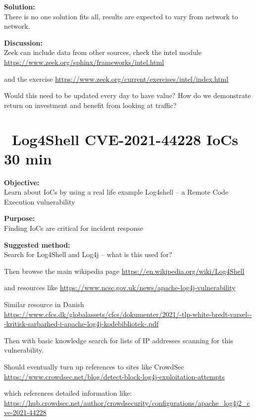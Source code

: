 \documentclass[a4paper,11pt,notitlepage]{report}
\begin{document}
{\bf Solution:}\\
There is no one solution fits all, results are expected to vary from network to network.

{\bf Discussion:}\\
Zeek can include data from other sources, check the intel module\\
\url{https://www.zeek.org/sphinx/frameworks/intel.html}

and the exercise \url{https://www.zeek.org/current/exercises/intel/index.html}

Would this need to be updated every day to have value? How do we demonstrate return on investment and benefit from looking at traffic?






\chapter{\faExclamationTriangle\ Log4Shell CVE-2021-44228 IoCs 30 min}
\label{ex:log4shell-iocs}


{\bf Objective:}\\
Learn about IoCs by using a real life example Log4shell -- a Remote Code Execution vulnerability

{\bf Purpose:}\\
Finding IoCs are critical for incident response


{\bf Suggested method:}\\
Search for Log4Shell and Log4j -- what is this used for?

Then browse the main wikipedia page \url{https://en.wikipedia.org/wiki/Log4Shell}

and resources like \url{https://www.ncsc.gov.uk/news/apache-log4j-vulnerability}

Similar resource in Danish\\
 \url{https://www.cfcs.dk/globalassets/cfcs/dokumenter/2021/-tlp-white-bredt-varsel---kritisk-sarbarhed-i-apache-log4j-kodebibliotek-.pdf}

Then with basic knowledge search for lists of IP addresses scanning for this vulnerability.

Should eventually turn up references to sites like CrowdSec\\
\url{https://www.crowdsec.net/blog/detect-block-log4j-exploitation-attempts}

which references detailed information like:\\
\url{https://hub.crowdsec.net/author/crowdsecurity/configurations/apache_log4j2_cve-2021-44228}
\end{document}

